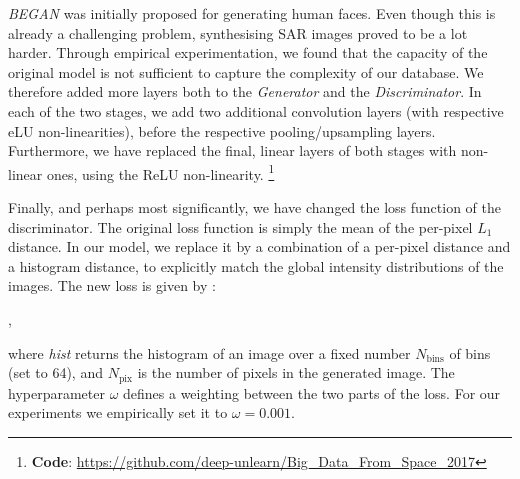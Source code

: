 \documentclass{article}
\begin{document}
\smallskip

\emph{BEGAN} was initially proposed for generating human faces. Even
though this is already a challenging problem, synthesising SAR images
proved to be a lot harder.
%
Through empirical experimentation, we found that the capacity of the
original model is not sufficient to capture the complexity of our
database. We therefore added more layers both to the \emph{Generator}
and the \emph{Discriminator}.
%
In each of the two stages, we add two additional convolution layers
(with respective eLU non-linearities), before the respective
pooling/upsampling layers.
%
Furthermore, we have replaced the final, linear layers of both stages
with non-linear ones, using the ReLU non-linearity.
\footnote{\textbf{Code}: \url{https://github.com/deep-unlearn/Big\_Data\_From\_Space\_2017}}

\smallskip

\noindent
Finally, and perhaps most significantly, we have changed the loss function of the discriminator.%
The original loss function is simply the mean of the per-pixel \emph{$L_1$} 
distance.
%
In our model, we replace it by a combination of a per-pixel distance
and a histogram distance, to explicitly match the global intensity
distributions of the images.
%
The new loss is given by :

\smallskip

	
	\smallskip
	
	
	\smallskip
		
	\;,	

\smallskip

\noindent
where \emph{hist} returns the histogram of an image over a fixed
number $N_\text{bins}$ of bins (set to 64), and $N_\text{pix}$ is
the number of pixels in the generated image.
%
The hyperparameter $\omega$ defines a weighting between the two parts
of the loss. For our experiments we empirically set it to
$\omega=0.001$.
%
\end{document}

